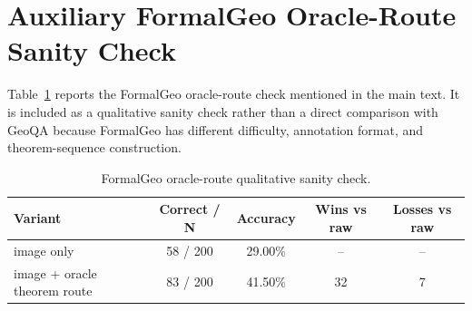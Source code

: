 \documentclass[11pt]{article}
\begin{document}
\appendix
\section{Auxiliary FormalGeo Oracle-Route Sanity Check}
\label{app:formalgeo}

Table~\ref{tab:formalgeo-oracle-route} reports the FormalGeo oracle-route check mentioned in the main text. It is included as a qualitative sanity check rather than a direct comparison with GeoQA because FormalGeo has different difficulty, annotation format, and theorem-sequence construction.

\begin{table}[h]
\centering
\caption{FormalGeo oracle-route qualitative sanity check.}
\label{tab:formalgeo-oracle-route}
\small
\begin{tabular}{lcccc}
\toprule
Variant & Correct / N & Accuracy & Wins vs raw & Losses vs raw \\
\midrule
image only & 58 / 200 & 29.00\% & -- & -- \\
image + oracle theorem route & 83 / 200 & 41.50\% & 32 & 7 \\
\bottomrule
\end{tabular}
\end{table}



\end{document}
